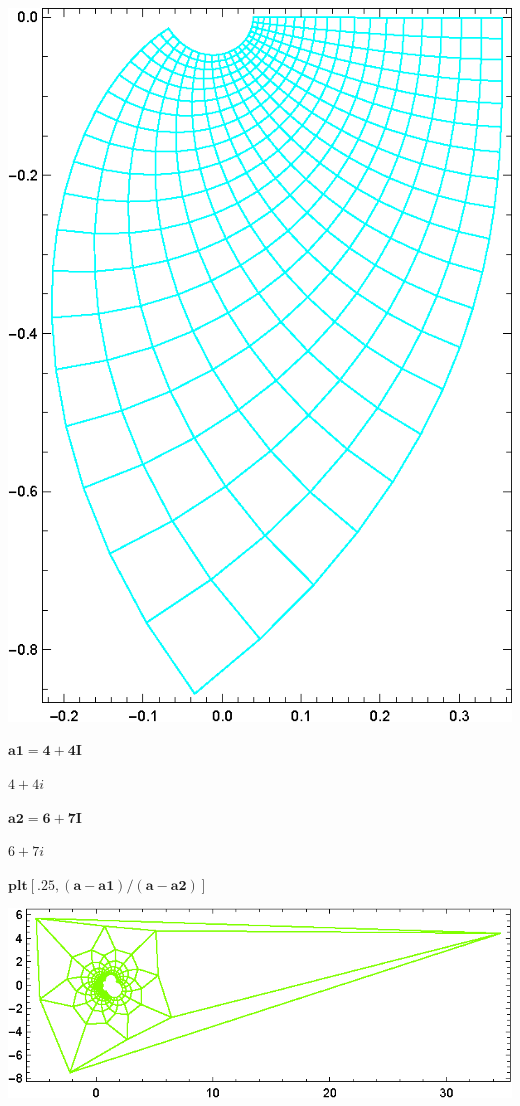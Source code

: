 \documentclass{article}
\begin{document}
\includegraphics{functions_on_complex-plane_gr13.eps}

\begin{doublespace}
\noindent\(\pmb{\text{a1}=4+4I}\)
\end{doublespace}

\begin{doublespace}
\noindent\(4+4 i\)
\end{doublespace}

\begin{doublespace}
\noindent\(\pmb{\text{a2}=6+7I}\)
\end{doublespace}

\begin{doublespace}
\noindent\(6+7 i\)
\end{doublespace}

\begin{doublespace}
\noindent\(\pmb{\text{plt}[.25,(a-\text{a1})/(a-\text{a2})]}\)
\end{doublespace}

\includegraphics{functions_on_complex-plane_gr14.eps}
\end{document}
